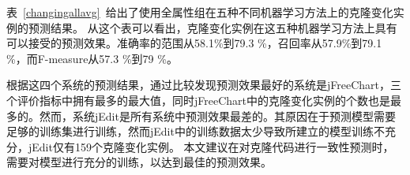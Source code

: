 

表~\ref{changingallavg}~给出了使用全属性组在五种不同机器学习方法上的克隆变化实例的预测结果。
从这个表可以看出，克隆变化实例在这五种机器学习方法上具有可以接受的预测效果。准确率的范围从58.1\%到79.3 \%，召回率从57.9\%到79.1 \%，而F-measure从57.3 \%到79 \%。

根据这四个系统的预测结果，通过比较发现预测效果最好的系统是jFreeChart，三个评价指标中拥有最多的最大值，同时jFreeChart中的克隆变化实例的个数也是最多的。然而，系统jEdit是所有系统中预测效果最差的。其原因在于预测模型需要足够的训练集进行训练，然而jEdit中的训练数据太少导致所建立的模型训练不充分，jEdit仅有159个克隆变化实例。%
本文建议在对克隆代码进行一致性预测时，需要对模型进行充分的训练，以达到最佳的预测效果。


